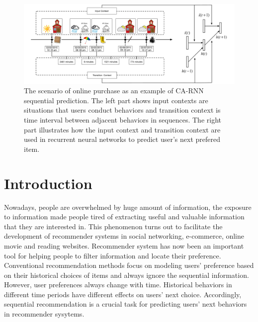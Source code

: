 \documentclass[conference]{IEEEtran}
\begin{document}
\begin{figure}[htb]
\centering
\includegraphics[width=1\linewidth]{./introModel.pdf}
\caption{The scenario of online purchase as an example of CA-RNN sequential prediction. The left part shows input contexts are situations that users conduct behaviors and transition context is time interval between adjacent behaviors in sequences. The right part illustrates how the input context and transition context are used in recurrent neural networks to predict user's next prefered item.}
\label{fig:Model-intro}
\end{figure}

\section{Introduction}
Nowadays, people are overwhelmed by huge amount of information, the exposure to information made people tired of extracting useful and valuable information that they are interested in. This phenomenon turns out to facilitate the development of recommender systems in social networking, e-commerce, online movie and reading websites. Recommender system has now been an important tool for helping people to filter information and locate their preference. Conventional recommendation methods focus on modeling users' preference based on their historical choices of items and always ignore the sequential information. However, user preferences always change with time. Historical behaviors in different time periods have different effects on users' next choice. Accordingly, sequential recommendation is a crucial task for predicting users' next behaviors in recommender sysytems.
\end{document}
